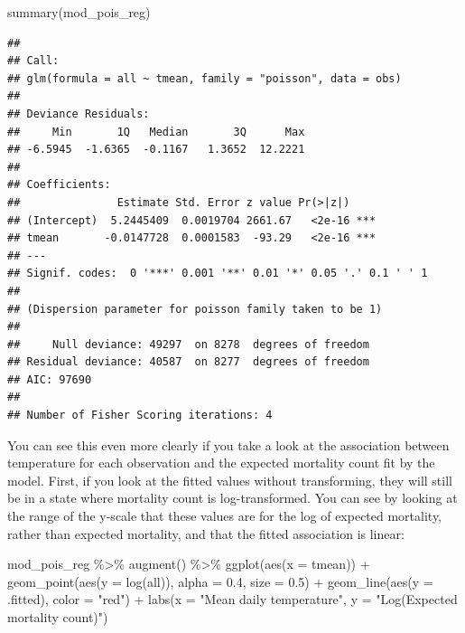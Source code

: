 \documentclass[
]{book}
\newenvironment{Shaded}{\begin{snugshade}}{\end{snugshade}}
\newcommand{\AttributeTok}[1]{\textcolor[rgb]{0.77,0.63,0.00}{#1}}
\newcommand{\FloatTok}[1]{\textcolor[rgb]{0.00,0.00,0.81}{#1}}
\newcommand{\FunctionTok}[1]{\textcolor[rgb]{0.00,0.00,0.00}{#1}}
\newcommand{\NormalTok}[1]{#1}
\newcommand{\SpecialCharTok}[1]{\textcolor[rgb]{0.00,0.00,0.00}{#1}}
\newcommand{\StringTok}[1]{\textcolor[rgb]{0.31,0.60,0.02}{#1}}
\begin{document}
\begin{Shaded}
\begin{Highlighting}[]
\FunctionTok{summary}\NormalTok{(mod\_pois\_reg)}
\end{Highlighting}
\end{Shaded}

\begin{verbatim}
## 
## Call:
## glm(formula = all ~ tmean, family = "poisson", data = obs)
## 
## Deviance Residuals: 
##     Min       1Q   Median       3Q      Max  
## -6.5945  -1.6365  -0.1167   1.3652  12.2221  
## 
## Coefficients:
##               Estimate Std. Error z value Pr(>|z|)    
## (Intercept)  5.2445409  0.0019704 2661.67   <2e-16 ***
## tmean       -0.0147728  0.0001583  -93.29   <2e-16 ***
## ---
## Signif. codes:  0 '***' 0.001 '**' 0.01 '*' 0.05 '.' 0.1 ' ' 1
## 
## (Dispersion parameter for poisson family taken to be 1)
## 
##     Null deviance: 49297  on 8278  degrees of freedom
## Residual deviance: 40587  on 8277  degrees of freedom
## AIC: 97690
## 
## Number of Fisher Scoring iterations: 4
\end{verbatim}

You can see this even more clearly if you take a look at the association between
temperature for each observation and the expected mortality count fit by the
model. First, if you look at the fitted values without transforming, they
will still be in a state where mortality count is log-transformed. You can
see by looking at the range of the y-scale that these values are for the log
of expected mortality, rather than expected mortality, and that the fitted
association is linear:

\begin{Shaded}
\begin{Highlighting}[]
\NormalTok{mod\_pois\_reg }\SpecialCharTok{\%\textgreater{}\%} 
  \FunctionTok{augment}\NormalTok{() }\SpecialCharTok{\%\textgreater{}\%} 
  \FunctionTok{ggplot}\NormalTok{(}\FunctionTok{aes}\NormalTok{(}\AttributeTok{x =}\NormalTok{ tmean)) }\SpecialCharTok{+} 
  \FunctionTok{geom\_point}\NormalTok{(}\FunctionTok{aes}\NormalTok{(}\AttributeTok{y =} \FunctionTok{log}\NormalTok{(all)), }\AttributeTok{alpha =} \FloatTok{0.4}\NormalTok{, }\AttributeTok{size =} \FloatTok{0.5}\NormalTok{) }\SpecialCharTok{+} 
  \FunctionTok{geom\_line}\NormalTok{(}\FunctionTok{aes}\NormalTok{(}\AttributeTok{y =}\NormalTok{ .fitted), }\AttributeTok{color =} \StringTok{"red"}\NormalTok{) }\SpecialCharTok{+} 
  \FunctionTok{labs}\NormalTok{(}\AttributeTok{x =} \StringTok{"Mean daily temperature"}\NormalTok{, }\AttributeTok{y =} \StringTok{"Log(Expected mortality count)"}\NormalTok{)}
\end{Highlighting}
\end{Shaded}
\end{document}
